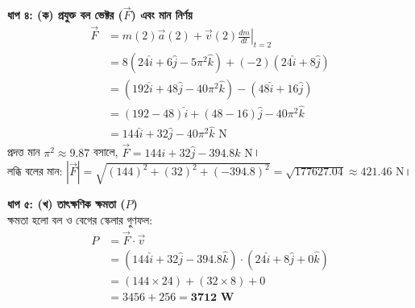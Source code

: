 \documentclass[12pt, a4paper]{article}
\begin{document}
\begin{tcolorbox}[solutionbox={সমাধান (Solution)}]
\vspace{1em}
\noindent
\textbf{ধাপ ৪: (ক) প্রযুক্ত বল ভেক্টর ($\vec{F}$) এবং মান নির্ণয়}
\begin{align*}
\vec{F} &= m(2)\vec{a}(2) + \vec{v}(2)\left.\frac{dm}{dt}\right|_{t=2} \\
        &= 8 \left( 24\hat{i} + 6\hat{j} - 5\pi^2\hat{k} \right) + (-2) \left( 24\hat{i} + 8\hat{j} \right) \\
        &= \left( 192\hat{i} + 48\hat{j} - 40\pi^2\hat{k} \right) - \left( 48\hat{i} + 16\hat{j} \right) \\
        &= (192 - 48)\hat{i} + (48 - 16)\hat{j} - 40\pi^2\hat{k} \\
        &= 144\hat{i} + 32\hat{j} - 40\pi^2\hat{k} \text{ N}
\end{align*}
প্রদত্ত মান $\pi^2 \approx 9.87$ বসালে, $\vec{F} = 144\hat{i} + 32\hat{j} - 394.8\hat{k} \text{ N}$। \\
লব্ধি বলের মান: $|\vec{F}| = \sqrt{(144)^2 + (32)^2 + (-394.8)^2} = \sqrt{177627.04} \approx 421.46 \text{ N}$।

\vspace{1em}
\noindent
\textbf{ধাপ ৫: (খ) তাৎক্ষণিক ক্ষমতা ($P$)} \\
ক্ষমতা হলো বল ও বেগের স্কেলার গুণফল:
\begin{align*}
P &= \vec{F} \cdot \vec{v} \\
  &= \left( 144\hat{i} + 32\hat{j} - 394.8\hat{k} \right) \cdot \left( 24\hat{i} + 8\hat{j} + 0\hat{k} \right) \\
  &= (144 \times 24) + (32 \times 8) + 0 \\
  &= 3456 + 256 = \textbf{3712 W}
\end{align*}


\end{tcolorbox}
\end{document}
